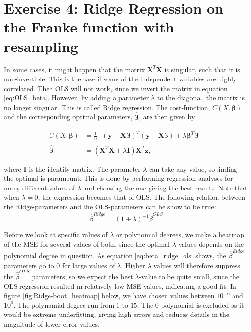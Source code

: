 \documentclass[reprint,english,notitlepage,aps,nobalancelastpage,nofootinbib]{revtex4-1}  %
\newcommand{\vc}[1]{\mathbf{#1}}
\begin{document}
\section*{Exercise 4: Ridge Regression on the Franke function with resampling}
In some cases, it might happen that the matrix $\mathbf{X}^T\mathbf{X}$ is singular, such that it is non-invertible. This is the case if some of the independent variables are highly correlated. Then OLS will not work, since we invert the matrix in equation \eqref{eq:OLS_beta}. However, by adding a parameter $\lambda$ to the diagonal, the matrix is no longer singular. This is called Ridge regression. The cost-function, $C(X,\bm{\beta})$, and the corresponding optimal parameters, $\boldsymbol{\hat\beta}$, are then given by

\begin{align*}
	C(X,\boldsymbol\beta) &= \frac{1}{n} \left[ \left(\mathbf{y}-\mathbf{X}\boldsymbol\beta\right)^T \left(\mathbf{y}-\mathbf{X}\boldsymbol\beta\right) + \lambda\boldsymbol\beta^T\boldsymbol\beta \right]
	\\
	\boldsymbol{\hat{\beta}} &= (\mathbf{X}^T\mathbf{X}+\lambda \mathbf{I})\mathbf{X}^T\vc{z},
\end{align*}

where $\mathbf{I}$ is  the identity matrix. The parameter $\lambda$ can take any value, so finding the optimal is paramount. This is done by performing regression analyses for many different values of $\lambda$ and choosing the one giving the best results. Note that when $\lambda=0$, the expression becomes that of OLS. The following relation between the Ridge-parameters and the OLS-parameters can be show to be true:
\begin{equation}\label{eq:beta_ridge_ols}
	\hat{\beta}^{Ridge} = (1 + \lambda)^{-1}\hat{\beta}^{OLS}
\end{equation}

Before we look at specific values of $\lambda$ or polynomial degrees, we make a heatmap of the MSE for several values of both, since the optimal $\lambda$-values depends on the polynomial degree in question. As equation \eqref{eq:beta_ridge_ols} shows, the $\hat{\beta}^{Ridge}$ parameters go to $0$ for large values of $\lambda$. Higher $\lambda$ values will therefore suppress the $\hat{\beta}^{OLS}$ parameters, so we expect the best $\lambda$-value to be quite small, since the OLS regression resulted in relatively low MSE values, indicating a good fit. In figure \ref{fig:Ridge-boot_heatmap} below, we have chosen values between $10^{-6}$ and $10^0$. The polynomial degree run from $1$ to $15$. The 0-polynomial is excluded as it would be extreme underfitting, giving high errors and reduces details in the magnitude of lower error values.
\end{document}
